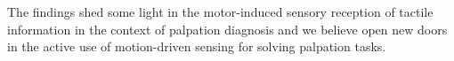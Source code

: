 \documentclass[]{interact}
\theoremstyle{plain}%
\theoremstyle{definition}
\theoremstyle{remark}
\begin{document}
The findings shed some light in the motor-induced sensory reception of tactile information in the 
context of palpation diagnosis and we believe open new doors in the active use of 
motion-driven sensing for solving palpation tasks.









%
%	
%		

\bigskip
\end{document}
